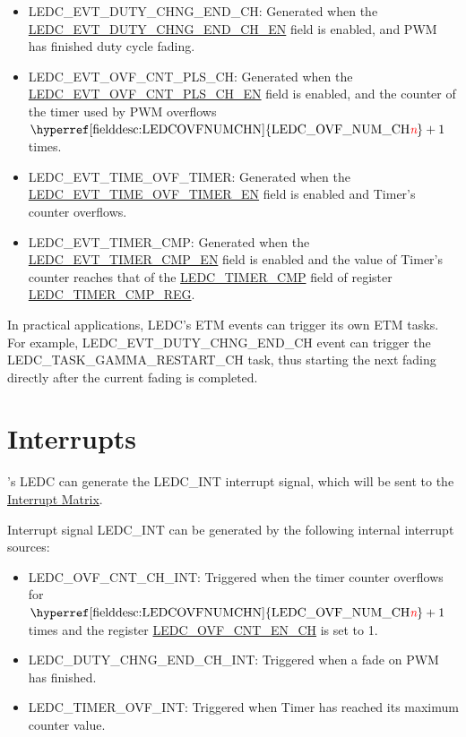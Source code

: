 \documentclass[main\_\_EN.tex]{subfiles}
\begin{document}
\begin{itemize}
    \item LEDC\_EVT\_DUTY\_CHNG\_END\_CH: Generated when the \hyperref[fielddesc:LEDCEVTDUTYCHNGENDCHNEN]{LEDC\_EVT\_DUTY\_CHNG\_END\_CH\_EN} field is enabled, and PWM has finished duty cycle fading.
    \item LEDC\_EVT\_OVF\_CNT\_PLS\_CH: Generated when the \hyperref[fielddesc:LEDCEVTOVFCNTPLSCHNEN]{LEDC\_EVT\_OVF\_CNT\_PLS\_CH\_EN} field is enabled, and the counter of the timer used by PWM overflows $ \textrm{\hyperref[fielddesc:LEDCOVFNUMCHN]{LEDC\_OVF\_NUM\_CH\regindex{n}}} + 1 $ times.
    \item LEDC\_EVT\_TIME\_OVF\_TIMER: Generated when the \hyperref[fielddesc:LEDCEVTTIMEOVFTIMERXEN]{LEDC\_EVT\_TIME\_OVF\_TIMER\_EN} field is enabled and Timer's counter overflows.
    \item LEDC\_EVT\_TIMER\_CMP: Generated when the \hyperref[fielddesc:LEDCEVTTIMERXCMPEN]{LEDC\_EVT\_TIMER\_CMP\_EN} field is enabled and the value of Timer's counter reaches that of the \hyperref[fielddesc:LEDCTIMERXCMP]{LEDC\_TIMER\_CMP} field of register \hyperref[regdesc:LEDCTIMERXCMPREG]{LEDC\_TIMER\_CMP\_REG}.
\end{itemize}

In practical applications, LEDC's ETM events can trigger its own ETM tasks. For example, LEDC\_EVT\_DUTY\_CHNG\_END\_CH event can trigger the LEDC\_TASK\_GAMMA\_RESTART\_CH task, thus starting the next fading directly after the current fading is completed.

\section{Interrupts}

\chipname{}'s LEDC can generate the LEDC\_INT interrupt signal, which will be sent to the \hyperref[mod:intmtrx]{Interrupt Matrix}.

Interrupt signal LEDC\_INT can be generated by the following internal interrupt sources:

\begin{itemize}
\item \label{int:ledc-ovf-cnt}LEDC\_OVF\_CNT\_CH\_INT: Triggered when the timer counter overflows for $ \textrm{\hyperref[fielddesc:LEDCOVFNUMCHN]{LEDC\_OVF\_NUM\_CH\regindex{n}}} + 1 $ times and the register \hyperref[fielddesc:LEDCOVFCNTENCHN]{LEDC\_OVF\_CNT\_EN\_CH} is set to 1.
\item \label{int:ledc-duty-chng-end}LEDC\_DUTY\_CHNG\_END\_CH\_INT: Triggered when a fade on PWM has finished.
\item \label{int:ledc-timer-ovf}LEDC\_TIMER\_OVF\_INT: Triggered when Timer has reached its maximum counter value.
\end{itemize}
\end{document}
